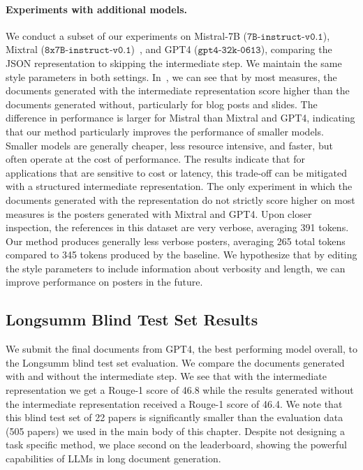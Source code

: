 \paragraph{Experiments with additional models.} We conduct a subset of our experiments on Mistral-7B ($\texttt{7B-instruct-v0.1}$), Mixtral ($\texttt{8x7B-instruct-v0.1
}$)~\cite{jiang2023mistral7b,Jiang2024MixtralOE}, and GPT4 ($\texttt{gpt4-32k-0613}$), comparing the JSON representation to skipping the intermediate step.  We maintain the same style parameters in both settings. In~, we can see that by most measures, the documents generated with the intermediate representation score higher than the documents generated without, particularly for blog posts and slides. The difference in performance is larger for Mistral than Mixtral and GPT4, indicating that our method particularly improves the performance of smaller models. Smaller models are generally cheaper, less resource intensive, and faster, but often operate at the cost of performance. The results indicate that for applications that are sensitive to cost or latency, this trade-off can be mitigated with a structured intermediate representation. The only experiment in which the documents generated with the representation do not strictly score higher on most measures is the posters generated with Mixtral and GPT4. Upon closer inspection, the references in this dataset are very verbose, averaging 391 tokens. Our method produces generally less verbose posters, averaging 265 total tokens compared to 345 tokens produced by the baseline. We hypothesize that by editing the style parameters to include information about verbosity and length, we can improve performance on posters in the future.


\subsection{Longsumm Blind Test Set Results}\label{sec:longsumm-blind}
We submit the final documents from GPT4, the best performing model overall, to the Longsumm blind test set evaluation. We compare the documents generated with and without the intermediate step. We see that with the intermediate representation we get a Rouge-1 score of 46.8 while the results generated without the intermediate representation received a Rouge-1 score of 46.4. We note that this blind test set of 22 papers is significantly smaller than the evaluation data (505 papers) we used in the main body of this chapter. Despite not designing a task specific method, we place second on the leaderboard, showing the powerful capabilities of LLMs in long document generation.

